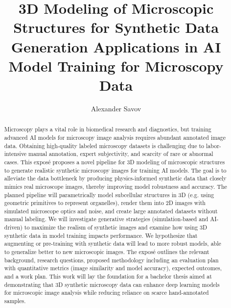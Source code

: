 \documentclass[
oneside,      %
openany       %
]{imc-inf}
\title{3D Modeling of Microscopic Structures for Synthetic Data Generation Applications in AI Model Training for Microscopy Data}
\subtitle{\mbox{}} %
\author{Alexander Savov}
\begin{document}
	\frontmatter\maketitle{}
	
	\begin{declarations}\end{declarations}
	
	
	\begin{abstract}
		Microscopy plays a vital role in biomedical research and diagnostics, but training advanced AI models for microscopy image analysis requires abundant annotated image data. Obtaining high-quality labeled microscopy datasets is challenging due to labor-intensive manual annotation, expert subjectivity, and scarcity of rare or abnormal cases. This exposé proposes a novel pipeline for 3D modeling of microscopic structures to generate realistic synthetic microscopy images for training AI models. The goal is to alleviate the data bottleneck by producing physics-informed synthetic data that closely mimics real microscope images, thereby improving model robustness and accuracy. The planned pipeline will parametrically model subcellular structures in 3D (e.g. using geometric primitives to represent organelles), render them into 2D images with simulated microscope optics and noise, and create large annotated datasets without manual labeling. We will investigate generative strategies (simulation-based and AI-driven) to maximize the realism of synthetic images and examine how using 3D synthetic data in model training impacts performance. We hypothesize that augmenting or pre-training with synthetic data will lead to more robust models, able to generalize better to new microscopic images. The exposé outlines the relevant background, research questions, proposed methodology including an evaluation plan with quantitative metrics (image similarity and model accuracy), expected outcomes, and a work plan. This work will lay the foundation for a bachelor thesis aimed at demonstrating that 3D synthetic microscopy data can enhance deep learning models for microscopic image analysis while reducing reliance on scarce hand-annotated samples.
		
	\end{abstract}
	
	
	
\end{document}

